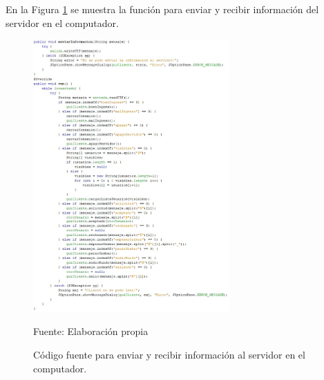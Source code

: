 En la Figura \ref{fig:figura3.65} se muestra la función para enviar y recibir información del servidor en el computador.
\begin{figure}[H]
\captionsetup{justification=centering}
\begin{center}
\includegraphics[width=0.67\textwidth]{Imagenes/Cap3/image065}
\end{center}
\begin{center}
\vskip -0.5cm
\caption{\small{Código fuente para enviar y recibir información al servidor en el computador.}}
\label{fig:figura3.65}
{\small{Fuente: Elaboración propia}}
\end{center}
\end{figure}

